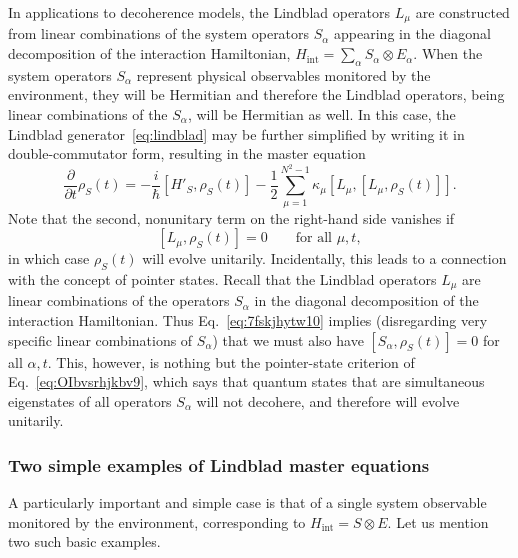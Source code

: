 \documentclass[3p,sort&compress,12pt]{elsarticle}
\newcommand{\I}{\ensuremath{i}}
\newcommand{\op}[1]{#1}
\begin{document}
In applications to decoherence models, the Lindblad operators $\op{L}_\mu$ are constructed from linear combinations of the system operators $\op{S}_\alpha$ appearing in the diagonal decomposition of the interaction Hamiltonian, $\op{H}_\text{int} = \sum_\alpha \op{S}_\alpha \otimes \op{E}_\alpha$. When the system operators $\op{S}_\alpha$ represent physical observables monitored by the environment, they will be Hermitian and therefore the Lindblad operators, being linear combinations of the $\op{S}_\alpha$, will be Hermitian as well. In this case, the Lindblad generator~\eqref{eq:lindblad} may be further simplified by writing it in double-commutator form, resulting in the master equation 
%
\begin{equation}\label{eq:lindbladc}
\frac{\partial}{\partial t} \op{\rho}_S(t) = - \frac{\I}{\hbar} \left[ \op{H}'_S, \op{\rho}_S(t) \right] - \frac{1}{2} \sum_{\mu=1}^{N^2-1} \kappa_\mu \left[ \op{L}_\mu, \left[ \op{L}_\mu, \op{\rho}_S(t) \right]
\right].
\end{equation}
%
Note that the second, nonunitary term on the right-hand side vanishes if 
%
\begin{equation}
  \label{eq:7fskjhytw10}
  \left[ \op{L}_\mu, \op{\rho}_S(t) \right] = 0 \qquad \text{for all $\mu,t$},
\end{equation}
%
in which case $\op{\rho}_S(t)$ will evolve unitarily. Incidentally, this leads to a connection with the concept of pointer states. Recall that the Lindblad operators $\op{L}_\mu$ are linear combinations of the operators $\op{S}_\alpha$ in the diagonal decomposition of the interaction Hamiltonian. Thus Eq.~\eqref{eq:7fskjhytw10} implies (disregarding very specific linear combinations of $\op{S}_\alpha$) that we must also have $\left[ \op{S}_\alpha, \op{\rho}_S(t) \right] = 0$ for all $\alpha, t$. This, however, is nothing but the pointer-state criterion of Eq.~\eqref{eq:OIbvsrhjkbv9}, which says that quantum states that are simultaneous eigenstates of all operators $\op{S}_\alpha$ will not decohere, and therefore will evolve unitarily.

\subsubsection{\label{sec:two-simple-examples}Two simple examples of Lindblad master equations}

A particularly important and simple case is that of a single system observable monitored by the environment, corresponding to $\op{H}_\text{int} = \op{S} \otimes \op{E}$. Let us mention two such basic examples. 
\end{document}
